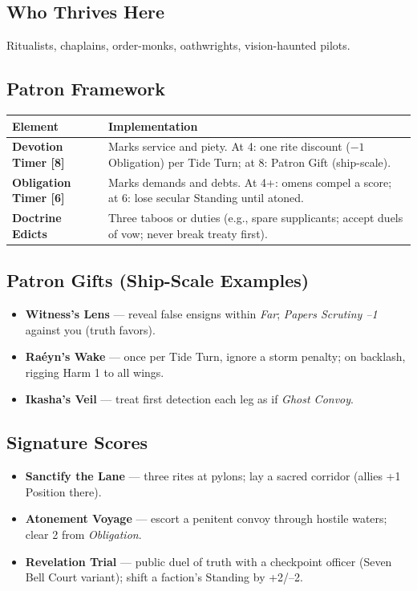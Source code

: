 \documentclass[11pt,oneside]{book}
\begin{document}
\begin{itemize}
\subsection*{Who Thrives Here}
Ritualists, chaplains, order-monks, oathwrights, vision-haunted pilots.

\subsection*{Patron Framework}
\begin{tabularx}{\linewidth}{@{}p{3.2cm} X@{}}
\toprule
\textbf{Element} & \textbf{Implementation}\\
\midrule
\textbf{Devotion Timer [8]} & Marks service and piety. At 4: one rite discount (\(-1\) Obligation) per Tide Turn; at 8: Patron Gift (ship-scale).\\
\textbf{Obligation Timer [6]} & Marks demands and debts. At 4+: omens compel a score; at 6: lose secular Standing until atoned.\\
\textbf{Doctrine Edicts} & Three taboos or duties (e.g., spare supplicants; accept duels of vow; never break treaty first).\\
\bottomrule
\end{tabularx}

\subsection*{Patron Gifts (Ship-Scale Examples)}
\begin{itemize}[leftmargin=*,itemsep=2pt]
  \item \textbf{Witness's Lens} --- reveal false ensigns within \emph{Far}; \emph{Papers Scrutiny --1} against you (truth favors).
  \item \textbf{Raéyn's Wake} --- once per Tide Turn, ignore a storm penalty; on backlash, rigging Harm 1 to all wings.
  \item \textbf{Ikasha's Veil} --- treat first detection each leg as if \emph{Ghost Convoy}.
\end{itemize}

\subsection*{Signature Scores}
\begin{itemize}[leftmargin=*,itemsep=2pt]
  \item \textbf{Sanctify the Lane} --- three rites at pylons; lay a sacred corridor (allies +1 Position there).
  \item \textbf{Atonement Voyage} --- escort a penitent convoy through hostile waters; clear 2 from \emph{Obligation}.
  \item \textbf{Revelation Trial} --- public duel of truth with a checkpoint officer (Seven Bell Court variant); shift a faction's Standing by +2/--2.
\end{itemize}


\end{itemize}
\end{document}
